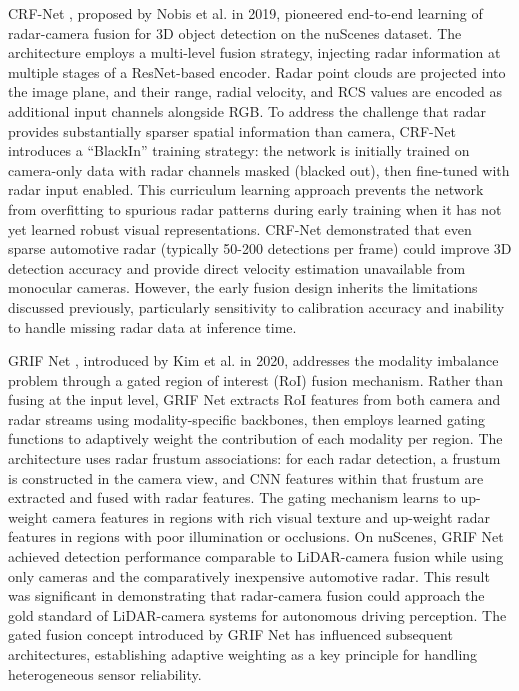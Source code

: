 CRF-Net \cite{Nobis2019CRFNet}, proposed by Nobis et al. in 2019, pioneered end-to-end learning of radar-camera fusion for 3D object detection on the nuScenes dataset. The architecture employs a multi-level fusion strategy, injecting radar information at multiple stages of a ResNet-based encoder. Radar point clouds are projected into the image plane, and their range, radial velocity, and RCS values are encoded as additional input channels alongside RGB. To address the challenge that radar provides substantially sparser spatial information than camera, CRF-Net introduces a ``BlackIn'' training strategy: the network is initially trained on camera-only data with radar channels masked (blacked out), then fine-tuned with radar input enabled. This curriculum learning approach prevents the network from overfitting to spurious radar patterns during early training when it has not yet learned robust visual representations. CRF-Net demonstrated that even sparse automotive radar (typically 50-200 detections per frame) could improve 3D detection accuracy and provide direct velocity estimation unavailable from monocular cameras. However, the early fusion design inherits the limitations discussed previously, particularly sensitivity to calibration accuracy and inability to handle missing radar data at inference time.

GRIF Net \cite{Kim2020GRIFNet}, introduced by Kim et al. in 2020, addresses the modality imbalance problem through a gated region of interest (RoI) fusion mechanism. Rather than fusing at the input level, GRIF Net extracts RoI features from both camera and radar streams using modality-specific backbones, then employs learned gating functions to adaptively weight the contribution of each modality per region. The architecture uses radar frustum associations: for each radar detection, a frustum is constructed in the camera view, and CNN features within that frustum are extracted and fused with radar features. The gating mechanism learns to up-weight camera features in regions with rich visual texture and up-weight radar features in regions with poor illumination or occlusions. On nuScenes, GRIF Net achieved detection performance comparable to LiDAR-camera fusion while using only cameras and the comparatively inexpensive automotive radar. This result was significant in demonstrating that radar-camera fusion could approach the gold standard of LiDAR-camera systems for autonomous driving perception. The gated fusion concept introduced by GRIF Net has influenced subsequent architectures, establishing adaptive weighting as a key principle for handling heterogeneous sensor reliability.

